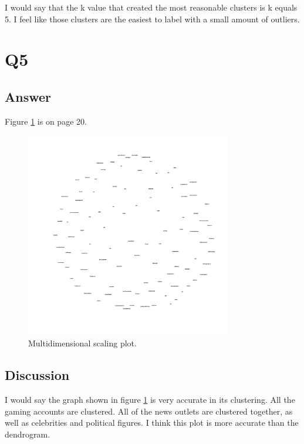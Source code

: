 \documentclass[12pt]{article}
\begin{document}
I would say that the k value that created the most reasonable clusters is k equals 5.  I feel like those clusters are the easiest to label with a small amount of outliers.

\section*{Q5}

\subsection*{Answer}

Figure \ref{fig:mds} is on page 20.

\begin{figure}[h]
    \centering
    \includegraphics[trim=0 0 0 0, clip, width=0.8\textwidth] {blogs2d.jpg}
    \caption{Multidimensional scaling plot.}
    \label{fig:mds}
\end{figure}

\subsection*{Discussion}
I would say the graph shown in figure \ref{fig:mds} is very accurate in its clustering. All the gaming accounts are clustered.  All of the news outlets are clustered together, as well as celebrities and political figures.  I think this plot is more accurate than the dendrogram.
\end{document}
